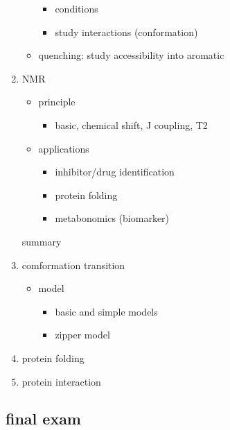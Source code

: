 \documentclass[]{article}
\begin{document}
\begin{enumerate}
\begin{itemize}
    \begin{itemize}
    \item
      conditions
    \item
      study interactions (conformation)
    \end{itemize}
  \item
    quenching: study accessibility into aromatic
  \end{itemize}
\item
  NMR

  \begin{itemize}
  \item
    principle

    \begin{itemize}
    \item
      basic, chemical shift, J coupling, T2
    \end{itemize}
  \item
    applications

    \begin{itemize}
    \item
      inhibitor/drug identification
    \item
      protein folding
    \item
      metabonomics (biomarker)
    \end{itemize}
  \end{itemize}

  summary
\item
  comformation transition

  \begin{itemize}
  \item
    model

    \begin{itemize}
    \item
      basic and simple models
    \item
      zipper model
    \end{itemize}
  \end{itemize}
\item
  protein folding
\item
  protein interaction
\end{enumerate}

\hypertarget{final-exam}{%
\subsection{final exam}\label{final-exam}}
\end{document}
